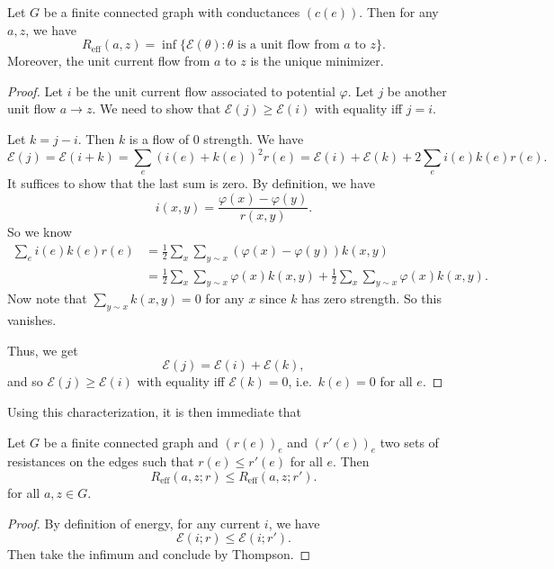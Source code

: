 \documentclass[a4paper]{article}
\begin{document}
\begin{thm}
  Let $G$ be a finite connected graph with conductances $(c(e))$. Then for any $a, z$, we have
  \[
    R_{\mathrm{eff}}(a, z) = \inf \{\mathcal{E}(\theta): \text{$\theta$ is a unit flow from $a$ to $z$}\}.
  \]
  Moreover, the unit current flow from $a$ to $z$ is the unique minimizer.
\end{thm}

\begin{proof}
  Let $i$ be the unit current flow associated to potential $\varphi$. Let $j$ be another unit flow $a \to z$. We need to show that $\mathcal{E}(j) \geq \mathcal{E}(i)$ with equality iff $j = i$.

  Let $k = j - i$. Then $k$ is a flow of $0$ strength. We have
  \[
    \mathcal{E}(j) = \mathcal{E}(i + k) = \sum_e (i(e) + k(e))^2 r(e) = \mathcal{E}(i) + \mathcal{E}(k) + 2 \sum_e i(e) k(e) r(e).
  \]
  It suffices to show that the last sum is zero. By definition, we have
  \[
    i(x, y) = \frac{\varphi(x) - \varphi(y)}{r(x, y)}.
  \]
  So we know
  \begin{align*}
    \sum_e i(e) k(e) r(e) &= \frac{1}{2} \sum_x \sum_{y \sim x} (\varphi(x) - \varphi(y)) k(x, y)\\
    &= \frac{1}{2} \sum_x \sum_{y \sim x} \varphi(x)k(x, y) + \frac{1}{2} \sum_x \sum_{y \sim x} \varphi(x) k(x, y).
  \end{align*}
  Now note that $\sum_{y \sim x} k(x, y) = 0$ for any $x$ since $k$ has zero strength. So this vanishes.

  Thus, we get
  \[
    \mathcal{E}(j) = \mathcal{E}(i) + \mathcal{E}(k),
  \]
  and so $\mathcal{E}(j) \geq \mathcal{E}(i)$ with equality iff $\mathcal{E}(k) = 0$, i.e.\ $k(e) = 0$ for all $e$.
\end{proof}
Using this characterization, it is then immediate that
\begin{thm}
  Let $G$ be a finite connected graph and $(r(e))_e$ and $(r'(e))_e$ two sets of resistances on the edges such that $r(e) \leq r'(e)$ for all $e$. Then
  \[
    R_{\mathrm{eff}}(a, z; r) \leq R_{\mathrm{eff}}(a, z; r').
  \]
  for all $a, z \in G$.
\end{thm}

\begin{proof}
  By definition of energy, for any current $i$, we have
  \[
    \mathcal{E}(i; r) \leq \mathcal{E}(i; r').
  \]
  Then take the infimum and conclude by Thompson.
\end{proof}
\end{document}

